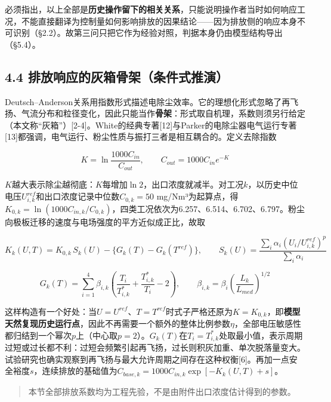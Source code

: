 \documentclass[UTF8,zihao=5,a4paper]{ctexart}
\begin{document}
必须指出，以上全部是\textbf{历史操作留下的相关关系}，只能说明操作者当时如何响应工况，不能直接翻译为控制量如何影响排放的因果结论——因为排放侧的响应本身不可识别（§2.2）。故第三问只把它作为经验对照，判据本身仍由模型结构导出（§5.4）。

\subsection*{4.4 排放响应的灰箱骨架（条件式推演）}

Deutsch–Anderson关系用指数形式描述电除尘效率。它的理想化形式忽略了再飞扬、气流分布和粒径变化，因此只能当作\textbf{骨架}：形式取自机理，系数则须另行给定（本文称“灰箱”）[2-4]。White的经典专著[12]与Parker的电除尘器电气运行专著[13]都强调，电气运行、粉尘性质与振打三者是相互耦合的。定义去除指数

\begin{equation}
K=\ln\frac{1000C_{in}}{C_{out}},\qquad C_{out}=1000C_{in}e^{-K}
\end{equation}

$K$越大表示除尘越彻底：$K$每增加$\ln 2$，出口浓度就减半。对工况$k$，以历史中位电压$U_{i,k}^{ref}$和出口浓度记录中位数$C_{0,k}=50$ mg/Nm³为起算点，得$K_{0,k}=\ln(1000C_{in,k}/C_{0,k})$，四类工况依次为6.257、6.514、6.702、6.797。粉尘向极板迁移的速度与电场强度的平方近似成正比，故取

\begin{equation}
K_k(U,T)=K_{0,k}\,S_k(U)-\{G_k(T)-G_k(T^{ref})\},\qquad
S_k(U)=\frac{\sum_{i}\alpha_i\left(U_i/U_{i,k}^{ref}\right)^{p}}{\sum_i\alpha_i}
\end{equation}

\begin{equation}
G_k(T)=\sum_{i=1}^{4}\beta_{i,k}
\left(\frac{T_i}{T_{i,k}^*}+\frac{T_{i,k}^*}{T_i}-2\right),
\qquad \beta_{i,k}=\beta_i\left(\frac{L_k}{L_{med}}\right)^{1/2}
\end{equation}

这样构造有一个好处：当$U=U^{ref}$、$T=T^{ref}$时式子严格还原为$K=K_{0,k}$，即\textbf{模型天然复现历史运行点}，因此不再需要一个额外的整体比例参数$\eta$，全部电压敏感性都归结到一个幂次$p$上（中心取$p=2$）。$G_k(T)$在$T_i=T_{i,k}^*$处取最小值，表示周期过短或过长都不利：过短会频繁引起再飞扬，过长则积灰加重、单次脱落量变大。试验研究也确实观察到再飞扬与最大允许周期之间存在这种权衡[6]。再加一点安全裕度$s$，连续排放的基础值为$C_{base,k}=1000C_{in,k}\exp[-K_k(U,T)+s]$。


\begin{quote}\small 本节全部排放系数均为工程先验，不是由附件出口浓度估计得到的参数。\end{quote}
\end{document}
